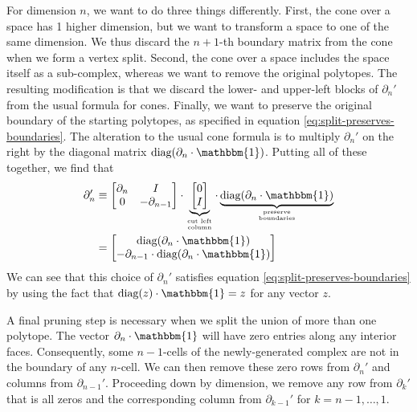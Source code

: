 \documentclass[twocolumn]{article}
\begin{document}
For dimension $n$, we want to do three things differently.
First, the cone over a space has 1 higher dimension, but we want to transform a space to one of the same dimension.
We thus discard the $n + 1$-th boundary matrix from the cone when we form a vertex split.
Second, the cone over a space includes the space itself as a sub-complex, whereas we want to remove the original polytopes.
The resulting modification is that we discard the lower- and upper-left blocks of $\partial_n'$ from the usual formula for cones.
Finally, we want to preserve the original boundary of the starting polytopes, as specified in equation \eqref{eq:split-preserves-boundaries}.
The alteration to the usual cone formula is to multiply $\partial_n'$ on the right by the diagonal matrix $\text{diag}(\partial_n\cdot\mathbbm{1})$.
Putting all of these together, we find that
\begin{align}
    \partial_n' & \equiv \left[\begin{matrix}\partial_n & I \\ 0 & -\partial_{n - 1}\end{matrix}\right]\cdot \underbrace{\left[\begin{matrix}0 \\ I\end{matrix}\right]}_{\text{cut left}\atop\text{column}}\cdot \underbrace{\text{diag}(\partial_n\cdot\mathbbm{1})}_{\text{preserve}\atop\text{boundaries}} \nonumber\\
        & = \left[\begin{matrix}\text{diag}(\partial_n\cdot\mathbbm{1}) \\ -\partial_{n - 1}\cdot\text{diag}(\partial_n\cdot\mathbbm{1})\end{matrix}\right]
    \label{eq:vertex-split-n}
\end{align}
We can see that this choice of $\partial_n'$ satisfies equation \eqref{eq:split-preserves-boundaries} by using the fact that $\text{diag}(z)\cdot\mathbbm{1} = z$ for any vector $z$.

A final pruning step is necessary when we split the union of more than one polytope.
The vector $\partial_n\cdot\mathbbm{1}$ will have zero entries along any interior faces.
Consequently, some $n - 1$-cells of the newly-generated complex are not in the boundary of any $n$-cell.
We can then remove these zero rows from $\partial_n'$ and columns from $\partial_{n - 1}'$.
Proceeding down by dimension, we remove any row from $\partial_k'$ that is all zeros and the corresponding column from $\partial_{k - 1}'$ for $k = n - 1, \ldots, 1$.
\end{document}
